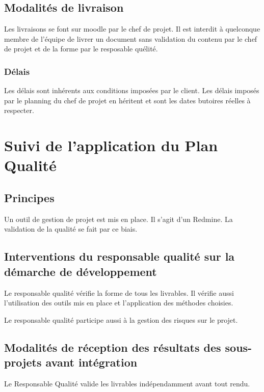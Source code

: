 \documentclass[twoside]{article}
\begin{document}
\subsection{Modalités de livraison}
Les livraisons se font sur moodle par le chef de projet.
Il est interdit à quelconque membre de l'équipe de livrer un document sans
validation du contenu par le chef de projet et de la forme par le resposable
quélité. 

\subsubsection{Délais}
Les délais sont inhérents aux conditions imposées par le client. Les délais imposés par le
planning du chef de projet en héritent et sont les dates butoires réelles à respecter. 



\section{Suivi de l'application du Plan Qualité}

\subsection{Principes}
Un outil de gestion de projet est mis en place. Il s'agit d'un Redmine.
La validation de la qualité se fait par ce biais.

\subsection{Interventions du responsable qualité sur la démarche de développement}
Le responsable qualité vérifie la forme de tous les livrables. Il vérifie aussi l'utilisation des outils mis en place
et l'application des méthodes choisies.

Le responsable qualité participe aussi à la gestion des risques sur le projet.

\subsection{Modalités de réception des résultats des sous-projets avant intégration}
Le Responsable Qualité valide les livrables indépendamment avant tout rendu.

\vfill
\pagebreak




\end{document}
